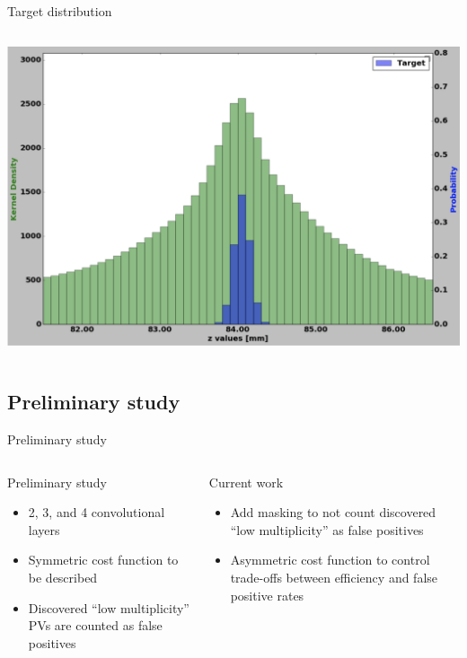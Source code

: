 \begin{frame}{Target distribution}
\begin{columns}[c]
\begin{center}
    \includegraphics[width=1\textwidth,height=0.45\textwidth, trim=18 0 18 0]{images/T_2_25.png}
  \end{center}
  \end{columns}
\end{frame}


\subsection{Preliminary study}
\begin{frame}{Preliminary study}
\begin{columns}[c]
    \begin{block}{Preliminary study}
      \begin{itemize}
          \item 2, 3, and 4 convolutional layers
          \item Symmetric cost function to be described
          \item Discovered ``low multiplicity'' PVs are counted as false positives
      \end{itemize}
    \end{block}
    \begin{block}{Current work}
      \begin{itemize}
          \item Add masking to not count discovered ``low multiplicity'' as false positives
          \item Asymmetric cost function to control trade-offs between efficiency  and false positive rates
      \end{itemize}
    \end{block}
  \end{columns}
\end{frame}



